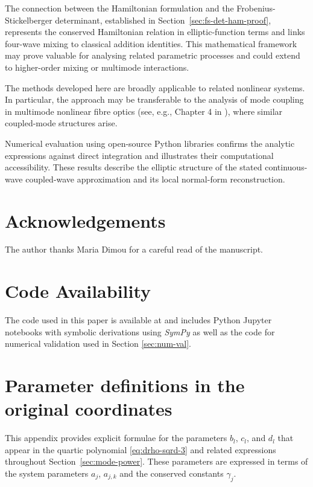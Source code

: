 \documentclass[11pt,a4paper]{article}
\numberwithin{equation}{section}
\begin{document}
The connection between the Hamiltonian formulation and the Frobenius-Stickelberger determinant, established in Section~\ref{sec:fs-det-ham-proof}, represents the conserved Hamiltonian relation in elliptic-function terms and links four-wave mixing to classical addition identities.
This mathematical framework may prove valuable for analysing related parametric processes and could extend to higher-order mixing or multimode interactions.

The methods developed here are broadly applicable to related nonlinear systems.
In particular, the approach may be transferable to the analysis of mode coupling in multimode nonlinear fibre optics (see, e.g., Chapter 4 in \cite{heskethNonlinearEffectsMultimode2014}), where similar coupled-mode structures arise.

Numerical evaluation using open-source Python libraries confirms the analytic expressions against direct integration and illustrates their computational accessibility.
These results describe the elliptic structure of the stated continuous-wave coupled-wave approximation and its local normal-form reconstruction.


\section*{Acknowledgements}
The author thanks Maria Dimou for a careful read of the manuscript.

\section*{Code Availability}
The code used in this paper is available at \cite{heskethHeskethGDFwmpaper2026} and includes Python Jupyter notebooks with symbolic derivations using \emph{SymPy} \cite{meurerSymPySymbolicComputing2017} as well as the code for numerical validation used in Section \ref{sec:num-val}.

\appendix



\section{Parameter definitions in the original coordinates}
\label{app:param-def-appendix}

This appendix provides explicit formulae for the parameters $b_l$, $c_l$, and $d_l$ that appear in the quartic polynomial \eqref{eq:drho-sqrd-3} and related expressions throughout Section~\ref{sec:mode-power}.
These parameters are expressed in terms of the system parameters $a_j$, $a_{j,k}$ and the conserved constants $\gamma_j$.
\end{document}
